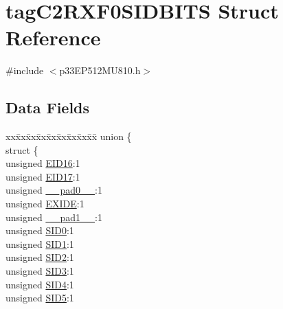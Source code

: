 \hypertarget{structtag_c2_r_x_f0_s_i_d_b_i_t_s}{}\section{tag\+C2\+R\+X\+F0\+S\+I\+D\+B\+I\+TS Struct Reference}
\label{structtag_c2_r_x_f0_s_i_d_b_i_t_s}


{\ttfamily \#include $<$p33\+E\+P512\+M\+U810.\+h$>$}

\subsection*{Data Fields}
\begin{DoxyCompactItemize}
\item 
\begin{tabbing}
xx\=xx\=xx\=xx\=xx\=xx\=xx\=xx\=xx\=\kill
union \{\\
\>struct \{\\
\>\>unsigned \hyperlink{structtag_c2_r_x_f0_s_i_d_b_i_t_s_a6dd5663b0c9838c56db040560ca0efa1}{EID16}:1\\
\>\>unsigned \hyperlink{structtag_c2_r_x_f0_s_i_d_b_i_t_s_aa648615464b0eb29967529333eee9fd9}{EID17}:1\\
\>\>unsigned \hyperlink{structtag_c2_r_x_f0_s_i_d_b_i_t_s_adf71f3d8410c1f1dbbc96680a92c49af}{\_\_pad0\_\_}:1\\
\>\>unsigned \hyperlink{structtag_c2_r_x_f0_s_i_d_b_i_t_s_a09ff1c1be3927220bd3dfbc10edfe243}{EXIDE}:1\\
\>\>unsigned \hyperlink{structtag_c2_r_x_f0_s_i_d_b_i_t_s_acaf2d0924a107ec6e8d2e31febaf66f9}{\_\_pad1\_\_}:1\\
\>\>unsigned \hyperlink{structtag_c2_r_x_f0_s_i_d_b_i_t_s_a1ca276ac15df60e1f7b9a6d0011ade93}{SID0}:1\\
\>\>unsigned \hyperlink{structtag_c2_r_x_f0_s_i_d_b_i_t_s_a3405d354f81391f879648f69f504dfc8}{SID1}:1\\
\>\>unsigned \hyperlink{structtag_c2_r_x_f0_s_i_d_b_i_t_s_ad744966dfc49307f731b7045b01b94e5}{SID2}:1\\
\>\>unsigned \hyperlink{structtag_c2_r_x_f0_s_i_d_b_i_t_s_a9345f3e64720be93e83d8dfc827f3f45}{SID3}:1\\
\>\>unsigned \hyperlink{structtag_c2_r_x_f0_s_i_d_b_i_t_s_aefb106fed4bb40e2c3c71ac612c554e3}{SID4}:1\\
\>\>unsigned \hyperlink{structtag_c2_r_x_f0_s_i_d_b_i_t_s_a0f221b3c9612231686bf87ccdcec8489}{SID5}:1\\

\end{tabbing}
\end{DoxyCompactItemize}
